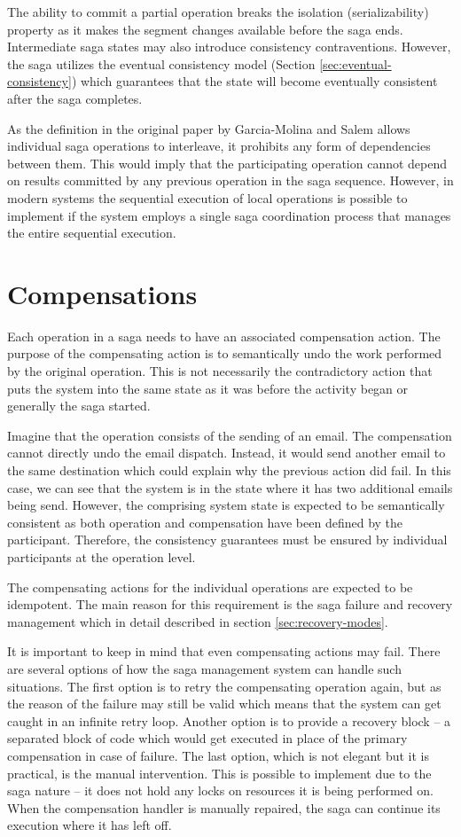 \documentclass[oneside,
  digital, %
  table,   %
  lof,     %
  lot,     %
]{fithesis3}
\begin{document}
The ability to commit a partial operation breaks the isolation (serializability) property as it makes the segment changes available before the saga ends. Intermediate saga states may also introduce consistency contraventions. However, the saga utilizes the eventual consistency model (Section \ref{sec:eventual-consistency}) which guarantees that the state will become eventually consistent after the saga completes.

As the definition in the original paper by Garcia-Molina and Salem \cite{sagas_publ} allows individual saga operations to interleave, it prohibits any form of dependencies between them. This would imply that the participating operation cannot depend on results committed by any previous operation in the saga sequence. However, in modern systems the sequential execution of local operations is possible to implement if the system employs a single saga coordination process that manages the entire sequential execution.

\section{Compensations}

Each operation in a saga needs to have an associated compensation action. The purpose of the compensating action is to semantically undo the work performed by the original operation. This is not necessarily the contradictory action that puts the system into the same state as it was before the activity began or generally the saga started. 

Imagine that the operation consists of the sending of an email. The  compensation cannot directly undo the email dispatch. Instead, it would send another email to the same destination which could explain why the previous action did fail. In this case, we can see that the system is in the state where it has two additional emails being send. However, the comprising system state is expected to be semantically consistent as both operation and compensation have been defined by the participant. Therefore, the consistency guarantees must be ensured by individual participants at the operation level.

The compensating actions for the individual operations are expected to be idempotent. The main reason for this requirement is the saga failure and recovery management which in detail described in section \ref{sec:recovery-modes}.

It is important to keep in mind that even compensating actions may fail. There are several options of how the saga management system can handle such situations. The first option is to retry the compensating operation again, but as the reason of the failure may still be valid which means that the system can get caught in an infinite retry loop. Another option is to provide a recovery block -- a separated block of code which would get executed in place of the primary compensation in case of failure. The last option, which is not elegant but it is practical, is the manual intervention. This is possible to implement due to the saga nature -- it does not hold any locks on resources it is being performed on. When the compensation handler is manually repaired, the saga can continue its execution where it has left off.
\end{document}

